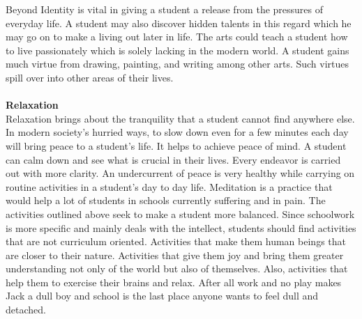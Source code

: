 \begin{mytcbox}{Beyond Identity}
is vital in giving a student a release from the pressures of everyday life. A student may also
discover hidden talents in this regard which he may go on to make a living out later in life. The
arts could teach a student how to live passionately which is solely lacking in the modern world.
A student gains much virtue from drawing, painting, and writing among other arts. Such virtues
spill over into other areas of their lives.
\\
\\
\textbf{Relaxation}
\\
Relaxation brings about the tranquility that a student cannot find anywhere else. In modern
society’s hurried ways, to slow down even for a few minutes each day will bring peace to a
student’s life. It helps to achieve peace of mind. A student can calm down and see what is
crucial in their lives. Every endeavor is carried out with more clarity. An undercurrent of peace
is very healthy while carrying on routine activities in a student’s day to day life. Meditation is a
practice that would help a lot of students in schools currently suffering and in pain.
The activities outlined above seek to make a student more balanced. Since schoolwork is more
specific and mainly deals with the intellect, students should find activities that are not
curriculum oriented. Activities that make them human beings that are closer to their nature.
Activities that give them joy and bring them greater understanding not only of the world but
also of themselves.
Also, activities that help them to exercise their brains and relax. After all work and no play
makes Jack a dull boy and school is the last place anyone wants to feel dull and detached.	
\end{mytcbox}